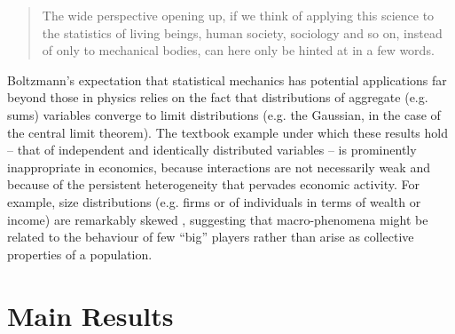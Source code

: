 \begin{quote}
The wide perspective opening up, if we think of applying this science
to the statistics of living beings, human society, sociology and so
on, instead of only to mechanical bodies, can here only be hinted at
in a few words. \cite{Boltzmann}
\end{quote}


Boltzmann's expectation that statistical mechanics has potential applications far beyond those in physics relies on the fact that distributions of aggregate (e.g. sums) variables converge to limit distributions (e.g. the Gaussian, in the case of the central limit theorem).  The textbook example under which these results hold -- that of independent and identically distributed variables -- is prominently inappropriate in economics, because interactions are not necessarily weak and because of the persistent heterogeneity that pervades economic activity. For example, size distributions (e.g. firms or of individuals in terms of wealth or income) are remarkably skewed \cite{firm-sizes, firm-sizes2, wealth-inequality, wealth-inequality2}, suggesting that macro-phenomena might be related to the behaviour of few ``big'' players rather than arise as collective properties of a population.

\section{Main Results}